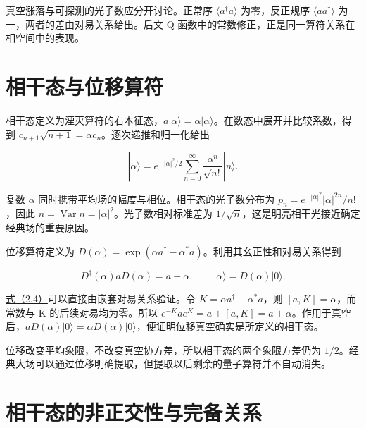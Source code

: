 \documentclass[UTF8,a4paper,zihao=-4,openany,fontset=fandol]{ctexbook}
\begin{document}
真空涨落与可探测的光子数应分开讨论。正常序 $\langle a^\dagger a\rangle$ 为零，反正规序 $\langle aa^\dagger\rangle$ 为一，两者的差由对易关系给出。后文 Q 函数中的常数修正，正是同一算符关系在相空间中的表现。



\section{相干态与位移算符}\label{sec:02:3}


相干态定义为湮灭算符的右本征态，$a|\alpha\rangle=\alpha|\alpha\rangle$。在数态中展开并比较系数，得到 $c_{n+1}\sqrt{n+1}=\alpha c_n$。逐次递推和归一化给出



\begin{equation*}
|\alpha\rangle=e^{-|\alpha|^2/2}
\sum_{n=0}^{\infty}\frac{\alpha^n}{\sqrt{n!}}|n\rangle.
\tag{2.3}\label{eq:2.3}
\end{equation*}


复数 $\alpha$ 同时携带平均场的幅度与相位。相干态的光子数分布为 $p_n=e^{-|\alpha|^2}|\alpha|^{2n}/n!$，因此 $\bar n=\operatorname{Var}n=|\alpha|^2$。光子数相对标准差为 $1/\sqrt{\bar n}$，这是明亮相干光接近确定经典场的重要原因。



位移算符定义为 $D(\alpha)=\exp(\alpha a^\dagger-\alpha^*a)$。利用其幺正性和对易关系得到



\begin{equation*}
D^\dagger(\alpha)aD(\alpha)=a+\alpha,\qquad
|\alpha\rangle=D(\alpha)|0\rangle.
\tag{2.4}\label{eq:2.4}
\end{equation*}


\hyperref[eq:2.4]{式（2.4）}可以直接由嵌套对易关系验证。令 $K=\alpha a^\dagger-\alpha^*a$，则 $[a,K]=\alpha$，而常数与 K 的后续对易均为零。所以 $e^{-K}ae^K=a+[a,K]=a+\alpha$。作用于真空后，$aD(\alpha)|0\rangle=\alpha D(\alpha)|0\rangle$，便证明位移真空确实是所定义的相干态。



位移改变平均象限，不改变真空协方差，所以相干态的两个象限方差仍为 $1/2$。经典大场可以通过位移明确提取，但提取以后剩余的量子算符并不自动消失。



\section{相干态的非正交性与完备关系}\label{sec:02:4}
\end{document}
